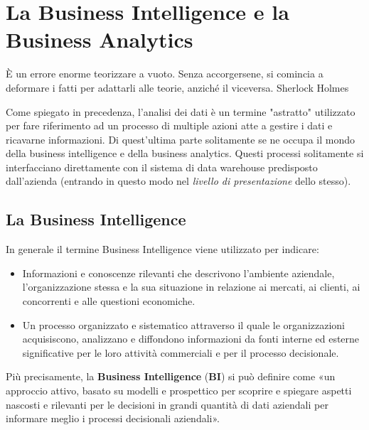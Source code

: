 \chapter{La Business Intelligence e la Business Analytics}
\label{ch:Business Intelligence and Analytics}

\begin{citazione}
È un errore enorme teorizzare a vuoto. Senza accorgersene, si comincia a deformare i fatti per adattarli alle teorie, anziché il viceversa. Sherlock Holmes\cite{conan_doyle_cyte}
\end{citazione}

Come spiegato in precedenza, l'analisi dei dati è un termine "astratto" utilizzato per fare riferimento ad un processo di multiple azioni atte a gestire i dati e ricavarne informazioni. Di quest'ultima parte solitamente se ne occupa il mondo della business intelligence e della business analytics. Questi processi solitamente si interfacciano direttamente con il sistema di data warehouse predisposto dall'azienda (entrando in questo modo nel \textit{livello di presentazione} dello stesso).  

\section{La Business Intelligence}
In generale il termine Business Intelligence viene utilizzato per indicare:\cite{meauserement_of_bi}

\begin{itemize}
    \item Informazioni e conoscenze rilevanti che descrivono l'ambiente aziendale, l'organizzazione stessa e la sua situazione in relazione ai mercati, ai clienti, ai concorrenti e alle questioni economiche.
    \item Un processo organizzato e sistematico attraverso il quale le organizzazioni acquisiscono, analizzano e diffondono informazioni da fonti interne ed esterne significative per le loro attività commerciali e per il processo decisionale.
\end{itemize}

Più precisamente, la \textbf{Business Intelligence} (\textbf{BI}) si può definire come «un approccio attivo, basato su modelli e prospettico per scoprire e spiegare aspetti nascosti e rilevanti per le decisioni in grandi quantità di dati aziendali per informare meglio i processi decisionali aziendali».\cite{bi_strategic_intelligence}

